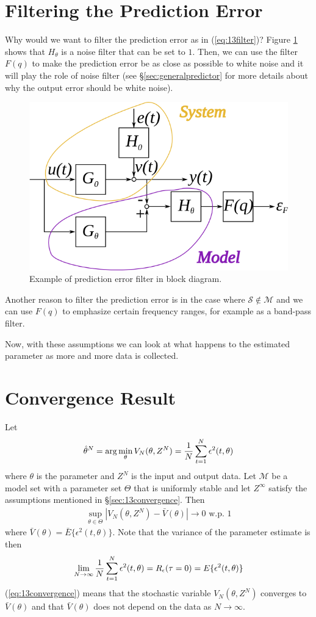 \section{Filtering the Prediction Error}
Why would we want to filter the prediction error as in (\ref{eq:13filter})? Figure \ref{fig:13errorfilter} shows that $H_\theta$ is a noise filter that can be set to $1$. Then, we can use the filter $F(q)$ to make the prediction error be as close as possible to white noise and it will play the role of noise filter (see \S\ref{sec:generalpredictor} for more details about why the output error should be white noise).

\begin{figure}[ht!]
	\centering
	\includegraphics[width=.5\textwidth]{images/13errorfilter}
	\caption{Example of prediction error filter in block diagram.}
	\label{fig:13errorfilter}
\end{figure}

Another reason to filter the prediction error is in the case where $\mathcal{S}\notin\mathcal{M}$ and we can use $F(q)$ to emphasize certain frequency ranges, for example as a band-pass filter.

Now, with these assumptions we can look at what happens to the estimated parameter as more and more data is collected.

\section{Convergence Result}
\label{sec:convergence}
Let
$$\hat{\theta}^N = \arg\min_\theta V_N(\theta,Z^N) = \frac{1}{N}\sum_{t=1}^N\epsilon^2(t,\theta)$$
where $\theta$ is the parameter and $Z^N$ is the input and output data. Let $\mathcal{M}$ be a model set with a parameter set $\Theta$ that is uniformly stable and let $Z^\infty$ satisfy the assumptions mentioned in \S\ref{sec:13convergence}. Then
\begin{align}
\label{eq:13convergence}
\sup_{\theta\in\Theta}\left|V_N(\theta,Z^N)-\bar{V}(\theta)\right| \to 0 \text{ w.p. } 1
\end{align}
where $\bar{V}(\theta)=\bar{E}\{\epsilon^2(t,\theta)\}$. Note that the variance of the parameter estimate is then
$$\lim_{N\to\infty}\frac{1}{N}\sum_{t=1}^N\epsilon^2(t,\theta) = R_\epsilon(\tau=0) = E\{\epsilon^2(t,\theta)\}$$
(\ref{eq:13convergence}) means that the stochastic variable $V_N(\theta,Z^N)$ converges to $\bar{V}(\theta)$ and that $\bar{V}(\theta)$ does not depend on the data as $N\to\infty$.

